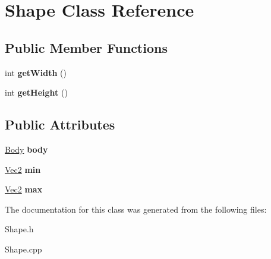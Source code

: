 \hypertarget{class_shape}{}\section{Shape Class Reference}
\label{class_shape}
\subsection*{Public Member Functions}
\begin{DoxyCompactItemize}
\item 
\mbox{\label{class_shape_ad1485b0471eb12dc0539aa4ba1de66f3}} 
int {\bfseries get\+Width} ()
\item 
\mbox{\label{class_shape_a0fbd27077f022719f7e16c598cb3d7e5}} 
int {\bfseries get\+Height} ()
\end{DoxyCompactItemize}
\subsection*{Public Attributes}
\begin{DoxyCompactItemize}
\item 
\mbox{\label{class_shape_aebaec5b8224d5cfb27301cdfda29efb4}} 
\mbox{\hyperlink{struct_body}{Body}} {\bfseries body}
\item 
\mbox{\label{class_shape_a67a5f0ae601986926a6f67ab9be60c37}} 
\mbox{\hyperlink{struct_vec2}{Vec2}} {\bfseries min}
\item 
\mbox{\label{class_shape_a29ebe3e5d8254e2accd1781cb404a9c8}} 
\mbox{\hyperlink{struct_vec2}{Vec2}} {\bfseries max}
\end{DoxyCompactItemize}


The documentation for this class was generated from the following files\+:\begin{DoxyCompactItemize}
\item 
Shape.\+h\item 
Shape.\+cpp\end{DoxyCompactItemize}
